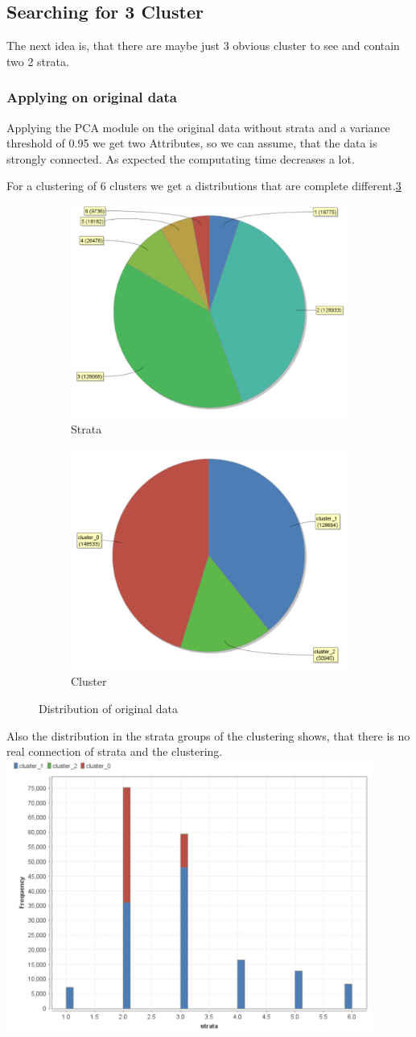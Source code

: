 \subsection{Searching for 3 Cluster}

The next idea is, that there are maybe just 3 obvious cluster to see and contain two 2 strata.

\subsubsection{Applying on original data}
Applying the PCA module on the original data without strata and a variance
threshold of 0.95 we get two Attributes, so we can assume, that the data is strongly connected. As expected the computating time decreases a lot. 

For a clustering of 6 clusters we get a distributions that are complete different.\ref{fig:OrgDist}
\begin{figure}[h]
\centering
\begin{subfigure}{.5\textwidth}
  \centering
  \includegraphics[width=.4\linewidth]{ClusterPCAOrigRapidStrata2Cluster.PNG}
  \caption{Strata}
  \label{fig:OrgSt}
\end{subfigure}%
\begin{subfigure}{.5\textwidth}
  \centering
  \includegraphics[width=.4\linewidth]{ClusterPCAOrigRapidCluster2Cluster.PNG}
  \caption{Cluster}
  \label{fig:OrgCl}
\end{subfigure}
\caption{Distribution of original data}
\label{fig:OrgDist}
\end{figure}

Also the distribution in the strata groups of the clustering shows, that there is no real connection of strata and the clustering.
\includegraphics[width=0.9\textwidth]{ClusterPCAOrigRapidDistribution2Cluster.PNG}
